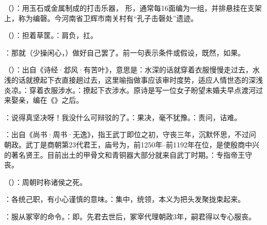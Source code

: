 {
\item {}（）：用玉石或金属制成的打击乐器， 形，通常每16面编为一组，并排悬挂在支架上，称为编磬。今河南省卫辉市南关村有“孔子击磬处”遗迹。
\item {}（）：担着草筐。：肩负，扛。
\item {}：那就（少操闲心，）做好自己罢了。前一句表示条件或假设，既然，如果。
\item {}（）：出自《诗经·邶风·有苦叶》，意思是：水深的话就穿着衣服慢慢走过去，水浅的话就撩起下衣直接趟过去，这里喻指做事应该审时度势，适应人情世态的深浅炎凉。：穿着衣服涉水。：撩起下衣涉水。原诗是写一位女子盼望未婚夫早点渡河过来娶亲，编在《》之后。
\item {}：说得真坚决呀！我没什么可辩驳的了。：果决，毫不犹豫。：责问，诘难。
}
{}  %


{
\item {}：出自《尚书·周书·无逸》，指王武丁即位之初，守丧三年，沉默怀思，不过问朝政。武丁是商朝第23代君王，庙号为，前1250年--前1192年在位，是使殷商中兴的著名贤王。目前出土的甲骨文和青铜器大部分就来自武丁时期。：专指帝王守丧。
\item {}（）：周朝时称诸侯之死。
\item {}：各统己职，有小心谨慎的意味。：集中，统领，本义为把头发聚拢束起来。
\item {}：服从冢宰的命令。：即。先君去世后，冢宰代理朝政3年，嗣君得以专心服丧。
}
{}


